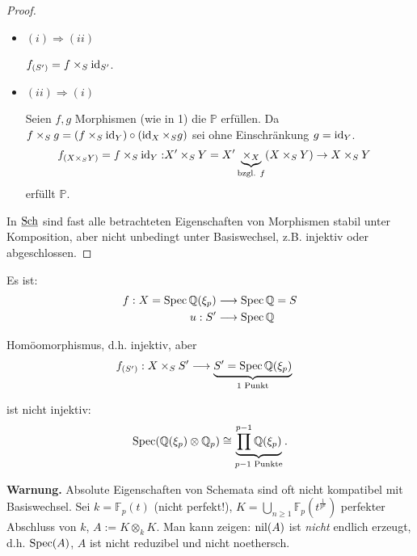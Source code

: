 \begin{proof}
  \mbox{}
  \begin{itemize}
  \item $(i)\Rightarrow(ii)$
  
  $f_{(S')}=f\times_{S}\operatorname{\mathrm{id}}_{S'}$.

  \item $(ii)\Rightarrow(i)$
  
  Seien $f,g$ Morphismen (wie in 1) die $\mathbb{P}$ erfüllen. Da
    $f\times_{S}g=(f\times_{S}\operatorname{\mathrm{id}}_{Y})\circ(\operatorname{\mathrm{id}}_{X}\times_{S}g)$ sei
    ohne Einschränkung $g=\operatorname{\mathrm{id}}_{Y}$.
    \begin{align*}
      f_{(X\times_{S}Y)}=f\times_{S}\operatorname{\mathrm{id}}_{Y}: & X'\times_{S}Y=X'\underbrace{\times_{X}}_{\text{bzgl. }f}(X\times_{S}Y)\rightarrow X\times_{S}Y
    \end{align*}
    erfüllt $\mathbb{P}$.
  \end{itemize}
  In $\operatorname{\underline{Sch}}$ sind fast alle betrachteten Eigenschaften von Morphismen
  stabil unter Komposition, aber nicht unbedingt unter Basiswechsel,
  z.B. injektiv oder abgeschlossen.
\end{proof}
\begin{example*}
  Es ist:
  \begin{align*}
    f:X=\operatorname{Spec}\mathbb{Q}(\xi_{p}) & \longrightarrow\operatorname{Spec}\mathbb{Q}=S\\
    u:S' & \longrightarrow\operatorname{Spec}\mathbb{Q}
  \end{align*}

  Homöomorphismus, d.h. injektiv, aber
  \begin{align*}
    f_{(S')}:X\times_{S}S' & \longrightarrow\underbrace{S'=\operatorname{Spec}\mathbb{Q}(\xi_{p})}_{1\text{ Punkt}}
  \end{align*}

  ist nicht injektiv:
  \[
    \operatorname{Spec}(\mathbb{Q}(\xi_{p})\otimes\mathbb{Q}_{p})\cong\underbrace{\prod^{p-1}\mathbb{Q}(\xi_{p})}_{p-1\text{ Punkte}}.
  \]
\end{example*}
\textbf{Warnung.} Absolute Eigenschaften von Schemata sind oft nicht
kompatibel mit Basiswechsel. Sei $k=\mathbb{F}_{p}(t)$ (nicht perfekt!), $K=\bigcup_{n\geq1}\mathbb{F}_{p}(t^{\frac{1}{p^{n}}})$
perfekter Abschluss von $k$, $A:=K\otimes_{k}K$. Man kann zeigen:
$\operatorname{nil}(A)$ ist \emph{nicht} endlich erzeugt, d.h. $\operatorname{Spec}(A)$, $A$
ist nicht reduzibel und nicht noethersch.